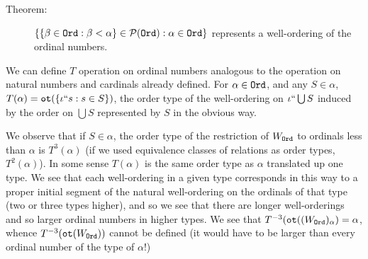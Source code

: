\documentclass[12pt]{article}
\begin{document}
\begin{description}

\item[Theorem:]  $\{\{\beta \in {\tt Ord}:\beta < \alpha\} \in {\cal P}({\tt Ord}):\alpha \in {\tt Ord}\}$ represents a well-ordering of the ordinal numbers.

\end{description}

We can define  $T$ operation on ordinal numbers analogous to the operation on natural numbers and cardinals already defined.  For $\alpha \in {\tt Ord}$, and any $S \in \alpha$,
$T(\alpha) = {\tt ot}(\{\iota``s:s \in S\})$, the order type of the well-ordering on $\iota``\bigcup S$ induced by the order on $\bigcup S$ represented by $S$ in the obvious way.

We observe that if $S \in \alpha$, the order type of the restriction of $W_{\tt Ord}$ to ordinals less than $\alpha$ is $T^3(\alpha)$ (if we used equivalence classes of relations as order types, $T^2(\alpha)$).  In some sense $T(\alpha)$ is the same order type as $\alpha$ translated up one type.  We see that each well-ordering in a given type corresponds in this way to a proper initial segment of the natural well-ordering on the ordinals of that type (two or three types higher), and so we see that there are longer well-orderings and so larger ordinal numbers in higher types.   We see that $T^{-3}({\tt ot}((W_{\tt Ord})_\alpha) = \alpha$, whence $T^{-3}({\tt ot}(W_{\tt Ord}))$ cannot be defined (it would have to be larger than every ordinal number of the type of $\alpha$!)
\end{document}
